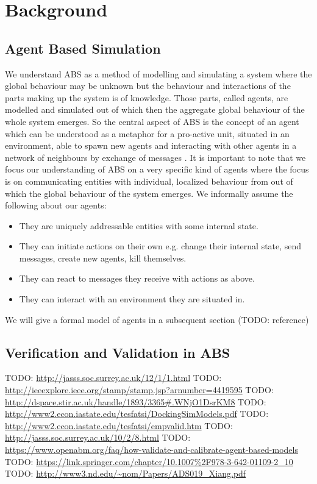 \section{Background}

\subsection{Agent Based Simulation}
We understand ABS as a method of modelling and simulating a system where the global behaviour may be unknown but the behaviour and interactions of the parts making up the system is of knowledge. Those parts, called agents, are modelled and simulated out of which then the aggregate global behaviour of the whole system emerges. So the central aspect of ABS is the concept of an agent which can be understood as a metaphor for a pro-active unit, situated in an environment, able to spawn new agents and interacting with other agents in a network of neighbours by exchange of messages \cite{wooldridge_introduction_2009}. It is important to note that we focus our understanding of ABS on a very specific kind of agents where the focus is on communicating entities with individual, localized behaviour from out of which the global behaviour of the system emerges. We informally assume the following about our agents:

\begin{itemize}
	\item They are uniquely addressable entities with some internal state.
	\item They can initiate actions on their own e.g. change their internal state, send messages, create new agents, kill themselves.
	\item They can react to messages they receive with actions as above.
	\item They can interact with an environment they are situated in.
\end{itemize} 

We will give a formal model of agents in a subsequent section (TODO: reference)







\subsection{Verification and Validation in ABS}
TODO: \url{http://jasss.soc.surrey.ac.uk/12/1/1.html}
TODO: \url{http://ieeexplore.ieee.org/stamp/stamp.jsp?arnumber=4419595}
TODO: \url{http://dspace.stir.ac.uk/handle/1893/3365#.WNjO1DsrKM8}
TODO: \url{http://www2.econ.iastate.edu/tesfatsi/DockingSimModels.pdf}
TODO: \url{http://www2.econ.iastate.edu/tesfatsi/empvalid.htm}
TODO: \url{http://jasss.soc.surrey.ac.uk/10/2/8.html}
TODO: \url{https://www.openabm.org/faq/how-validate-and-calibrate-agent-based-models}
TODO: \url{https://link.springer.com/chapter/10.1007%2F978-3-642-01109-2_10}
TODO: \url{http://www3.nd.edu/~nom/Papers/ADS019_Xiang.pdf}

